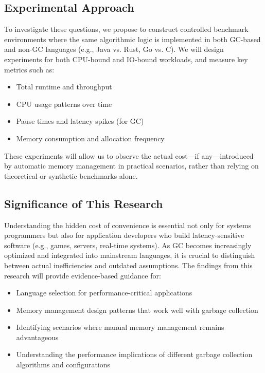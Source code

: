 \documentclass{article}
\begin{document}
\subsection{Experimental Approach}

To investigate these questions, we propose to construct controlled benchmark environments where the same algorithmic logic is implemented in both GC-based and non-GC languages (e.g., Java vs. Rust, Go vs. C). We will design experiments for both CPU-bound and IO-bound workloads, and measure key metrics such as:

\begin{itemize}
    \item Total runtime and throughput 
    \item CPU usage patterns over time 
    \item Pause times and latency spikes (for GC) 
    \item Memory consumption and allocation frequency 
\end{itemize}

These experiments will allow us to observe the actual cost—if any—introduced by automatic memory management in practical scenarios, rather than relying on theoretical or synthetic benchmarks alone.

\subsection{Significance of This Research}

Understanding the hidden cost of convenience is essential not only for systems programmers but also for application developers who build latency-sensitive software (e.g., games, servers, real-time systems). As GC becomes increasingly optimized and integrated into mainstream languages, it is crucial to distinguish between actual inefficiencies and outdated assumptions. The findings from this research will provide evidence-based guidance for:

\begin{itemize}
    \item Language selection for performance-critical applications 
    \item Memory management design patterns that work well with garbage collection 
    \item Identifying scenarios where manual memory management remains advantageous 
    \item Understanding the performance implications of different garbage collection algorithms and configurations 
\end{itemize}
\end{document}
